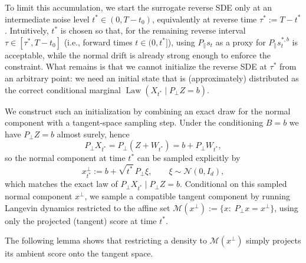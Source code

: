 \documentclass[twoside,11pt]{article}
\newcommand{\Nc}{\mathcal{N}}
\newcommand{\Mc}{\mathcal{M}}
\newcommand{\Law}{\operatorname{Law}}
\numberwithin{equation}{section}
\begin{document}
To limit this accumulation, we start the surrogate reverse SDE only at an intermediate noise level \(t^*\in(0,T-t_0)\),
equivalently at reverse time \(\tau^*:=T-t^*\). Intuitively, \(t^*\) is chosen so that, for the remaining reverse
interval \(\tau\in[\tau^*,T-t_0]\) (i.e., forward times \(t\in(0,t^*]\)), using \(P_\parallel s_t\) as a proxy for
\(P_\parallel s_t^{*,b}\) is acceptable, while the normal drift is already strong enough to enforce the constraint.
What remains is that we cannot initialize the reverse SDE at \(\tau^*\) from an arbitrary point: we need an initial
state that is (approximately) distributed as the correct conditional marginal \(\Law(X_{t^*}\mid P_{\perp}Z =b)\).

We construct such an initialization by combining an exact draw for the normal component with a tangent-space sampling
step. Under the conditioning \(B=b\) we have \(P_\perp Z=b\) almost surely, hence
\[
P_\perp X_{t^*}=P_\perp(Z+W_{t^*})=b+P_\perp W_{t^*},
\]
so the normal component at time \(t^*\) can be sampled explicitly by
\[
x^{\perp}_{t^*}:= b + \sqrt{t^*}\,P_\perp \xi,
\qquad \xi\sim\Nc(0,I_d),
\]
which matches the exact law of \(P_\perp X_{t^*}\mid P_{\perp}Z =b\). Conditional on this sampled normal component \(x^\perp\),
we sample a compatible tangent component by running Langevin dynamics restricted to the affine set
\(\Mc(x^\perp):=\{x:\;P_\perp x=x^\perp\}\), using only the projected (tangent) score at time \(t^*\).

The following lemma shows that restricting a density to \(\Mc(x^\perp)\) simply projects its ambient score onto the
tangent space.
\end{document}
